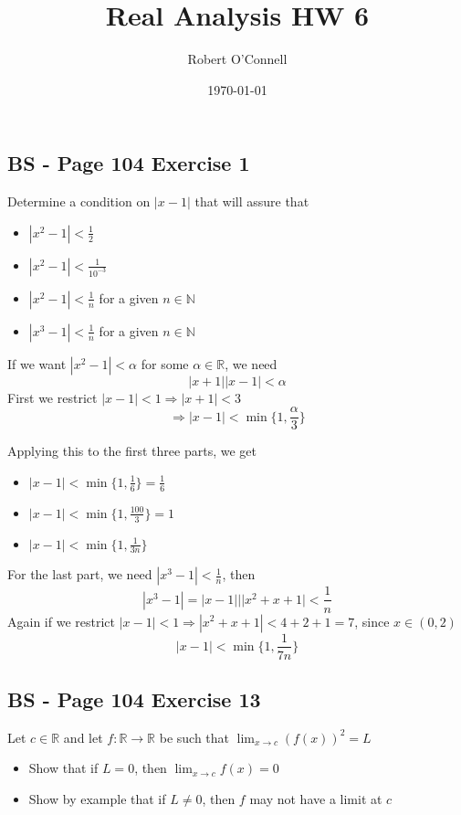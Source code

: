 \documentclass{article}
\title{\textbf{Real Analysis HW 6}}
\author{Robert O'Connell}
\date{\today}
\begin{document}
\maketitle
\vspace{5mm}

\subsection*{BS - Page 104 Exercise 1}
Determine a condition on \(|x-1|\) that will assure that
\begin{itemize}
    \item \(|x^2 -1| < \frac{1}{2}\)
    \item \(|x^2 -1| < \frac{1}{10^{-3}}\)
    \item \(|x^2 -1| < \frac{1}{n}\) for a given \(n \in \mathbb{N}\)
    \item \(|x^3 -1| < \frac{1}{n}\) for a given \(n \in \mathbb{N}\)
\end{itemize}

If we want \(|x^2 - 1|< \alpha\) for some \(\alpha \in \mathbb{R}\), we need
\[
|x+1||x-1| < \alpha
\]
First we restrict \(|x-1| < 1 \Rightarrow |x+1| < 3\)
\[
\Rightarrow |x-1| < \min\{1, \frac{\alpha}{3}\}
\]

Applying this to the first three parts, we get
\begin{itemize}
    \item \(|x-1| < \min\{1, \frac{1}{6}\} = \frac{1}{6}\)
    \item \(|x-1| < \min\{1, \frac{100}{3}\} = 1\)
    \item \(|x-1| < \min\{1, \frac{1}{3n}\} \)
\end{itemize}

For the last part, we need \(|x^3-1| < \frac{1}{n}\), then
\[
|x^3 -1| = |x-1|||x^2 + x + 1| < \frac{1}{n}
\]
Again if we restrict \(|x-1| < 1 \Rightarrow |x^2 + x + 1| < 4 + 2 + 1 = 7 \), since \(x \in (0,2)\)
\[
|x - 1| < \min\{1, \frac{1}{7n}\}
\]

\subsection*{BS - Page 104 Exercise 13}
Let \(c \in \mathbb{R}\) and let \(f:\mathbb{R} \rightarrow \mathbb{R}\) be such that
\(\lim_{x\to c}{(f(x))^2} = L\) 
\begin{itemize}
    \item Show that if \(L = 0\), then \(\lim_{x\to c}{f(x)} = 0\)
    \item Show by example that if \(L \neq 0\), then \(f\) may not have a limit at \(c\)
\end{itemize}
\end{document}
